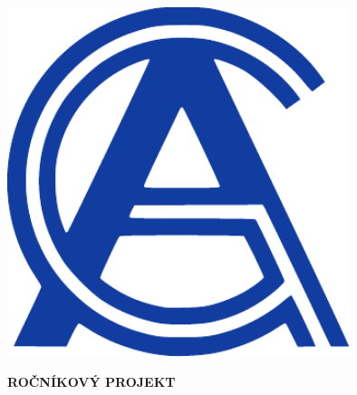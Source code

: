 

\pagestyle{empty}
\hypersetup{pageanchor=false}

\begin{center}

{\LARGE\bfseries\NazevSkoly}

\vspace{-22mm}
\vfill

{\LARGE\NazevOboru}

\vfill

\centerline{\mbox{\includegraphics[width=100mm]{../img/logo-ga-new.pdf}}}

\vspace{-8mm}
\vfill

{\bf\Large ROČNÍKOVÝ PROJEKT}

\vfill

{\Large \AutorPrace}

\vspace{15mm}

{\LARGE\bfseries\NazevPrace}




\vfill

\MesicOdevzdani \ \RokOdevzdani

\end{center}

